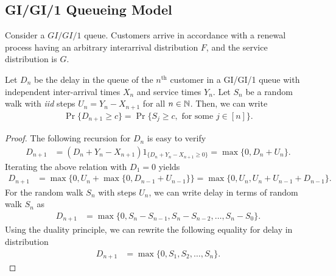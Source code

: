 \documentclass[a4paper,10pt,english]{article}
\begin{document}
\subsection{ GI/GI/1 Queueing Model}
Consider a $GI/GI/1$ queue. Customers arrive in accordance with a renewal process having an arbitrary interarrival distribution  $F$, and the service distribution is $G$. %
\begin{prop}
\label{prop_gigi1}
Let $D_n$ be the delay in the queue of the $n^\text{th}$ customer in a GI/GI/1 queue with independent inter-arrival times $X_n$ and service times $Y_n$. 
Let $S_n$ be a random walk with \textit{iid} steps $U_n = Y_n - X_{n+1}$ for all $n \in \mathbb{N}$. 
Then, we can write
\begin{align}
\label{GIGI1_prop_eqn}
\Pr\{D_{n+1} \geq c\} = \Pr\{S_j \geq c, \text{ for some }j \in [n]\}.
\end{align}
\end{prop}
\begin{proof}
The following recursion for $D_n$ is easy to verify
\begin{align*}
 D_{n+1} &= (D_n+Y_n-X_{n+1})1_{\{D_n+Y_n - X_{n+1} \geq 0\}} = \max\{0,D_n+U_n\}.
\end{align*}
Iterating the above relation with $D_1 = 0$ yields
\begin{align*}
D_{n+1}&= \max\{0,U_n+\max\{0,D_{n-1}+U_{n-1}\}\}=\max\{0,U_n,U_n+U_{n-1}+D_{n-1}\}.
\end{align*}
For the random walk $S_n$ with steps $U_n$, we can write delay in terms of random walk $S_n$ as
\begin{align*}
D_{n+1} &=\max\{0,S_n-S_{n-1},S_n-S_{n-2}, \ldots, S_n - S_0\}.
\end{align*}
Using the duality principle, we can rewrite the following equality for delay in distribution  
\begin{align*}
D_{n+1} &=\max\{0,S_1,S_2, \ldots , S_n\}.
\end{align*}
\end{proof}
\end{document}
